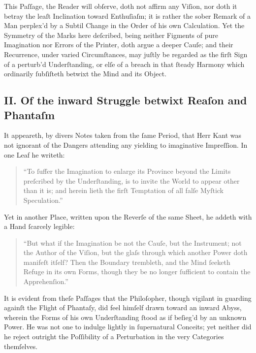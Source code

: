 \documentclass[12pt]{article}
\begin{document}
This Paſſage, the Reader will obſerve, doth not affirm any Viſion, nor doth 
it betray the leaſt Inclination toward Enthuſiaſm; it is rather the sober 
Remark of a Man perplex’d by a Subtil Change in the Order of his own 
Calculation. Yet the Symmetry of the Marks here deſcribed, being neither 
Figments of pure Imagination nor Errors of the Printer, doth argue a deeper 
Cauſe; and their Recurrence, under varied Circumſtances, may juſtly be regarded 
as the firſt Sign of a perturb’d Underſtanding, or elſe of a breach in that 
ſteady Harmony which ordinarily ſubſiſteth betwixt the Mind and its Object.


\subsection*{II. Of the inward Struggle betwixt Reaſon and Phantaſm}

It appeareth, by divers Notes taken from the ſame Period, that Herr Kant was 
not ignorant of the Dangers attending any yielding to imaginative Impreſſion. 
In one Leaf he writeth:

\begin{quote}
\small
“To ſuffer the Imagination to enlarge its Province beyond the Limits 
preſcribed by the Underſtanding, is to invite the World to appear other than it 
is; and herein lieth the firſt Temptation of all falſe Myſtick Speculation.”
\end{quote}

Yet in another Place, written upon the Reverſe of the same Sheet, he addeth 
with a Hand ſcarcely legible:

\begin{quote}
\small
“But what if the Imagination be not the Cauſe, but the Instrument; not the 
Author of the Viſion, but the glaſs through which another Power doth manifeſt 
itſelf? Then the Boundary trembleth, and the Mind ſeeketh Refuge in its own 
Forms, though they be no longer ſufficient to contain the Apprehenſion.”
\end{quote}

It is evident from theſe Paſſages that the Philoſopher, though vigilant in 
guarding againſt the Flight of Phantaſy, did feel himſelf drawn toward an 
inward Abyss, wherein the Forms of his own Underſtanding ſtood as if 
beſieg’d by an unknown Power. He was not one to indulge lightly in 
ſupernatural Conceits; yet neither did he reject outright the Poſſibility of 
a Perturbation in the very Categories themſelves.
\end{document}
